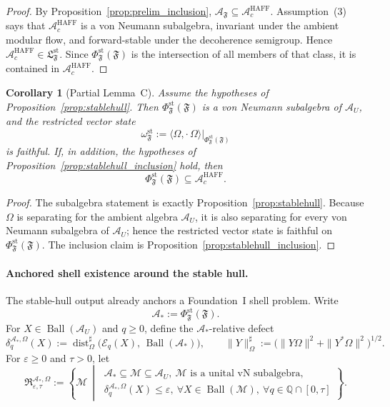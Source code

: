 \documentclass[12pt]{article}
\newtheorem{corollary}[theorem]{Corollary}
\theoremstyle{definition}
\theoremstyle{remark}
\begin{document}
\begin{proof}
By Proposition~\ref{prop:prelim_inclusion},
\(\mathcal A_{\mathfrak F}\subseteq \mathcal A_c^{\mathrm{HAFF}}\).
Assumption~(3) says that \(\mathcal A_c^{\mathrm{HAFF}}\) is a von
Neumann subalgebra, invariant under the ambient modular flow, and
forward-stable under the decoherence semigroup. Hence
\(\mathcal A_c^{\mathrm{HAFF}}\in \mathfrak L_{\mathfrak F}^{\mathrm{st}}\).
Since \(\Phi_{\mathfrak F}^{\mathrm{st}}(\mathfrak F)\) is the
intersection of all members of that class, it is contained in
\(\mathcal A_c^{\mathrm{HAFF}}\).
\end{proof}

\begin{corollary}[Partial Lemma~C]\label{cor:partialC}
Assume the hypotheses of Proposition~\ref{prop:stablehull}. Then
\(\Phi_{\mathfrak F}^{\mathrm{st}}(\mathfrak F)\) is a von Neumann
subalgebra of \(\mathcal A_U\), and the restricted vector state
\[
\omega_{\mathfrak F}^{\mathrm{st}}
:=
\langle\Omega,\cdot\,\Omega\rangle|_{\Phi_{\mathfrak F}^{\mathrm{st}}(\mathfrak F)}
\]
is faithful. If, in addition, the hypotheses of
Proposition~\ref{prop:stablehull_inclusion} hold, then
\[
\Phi_{\mathfrak F}^{\mathrm{st}}(\mathfrak F)\subseteq
\mathcal A_c^{\mathrm{HAFF}}.
\]
\end{corollary}

\begin{proof}
The subalgebra statement is exactly
Proposition~\ref{prop:stablehull}. Because \(\Omega\) is separating for
the ambient algebra \(\mathcal A_U\), it is also separating for every
von Neumann subalgebra of \(\mathcal A_U\); hence the restricted vector
state is faithful on
\(\Phi_{\mathfrak F}^{\mathrm{st}}(\mathfrak F)\). The inclusion claim
is Proposition~\ref{prop:stablehull_inclusion}.
\end{proof}

\paragraph{Anchored shell existence around the stable hull.}
The stable-hull output already anchors a Foundation~I shell problem.
Write
\[
\mathcal A_*:=\Phi_{\mathfrak F}^{\mathrm{st}}(\mathfrak F).
\]
For \(X\in\operatorname{Ball}(\mathcal A_U)\) and \(q\ge 0\), define
the \(\mathcal A_*\)-relative defect
\[
\delta_q^{\mathcal A_*,\Omega}(X)
:=
\operatorname{dist}_{\Omega}^{\sharp}
\bigl(\mathcal E_q(X),\,\operatorname{Ball}(\mathcal A_*)\bigr),
\qquad
\|Y\|_\Omega^\sharp
:=
\bigl(\|Y\Omega\|^2+\|Y^*\Omega\|^2\bigr)^{1/2}.
\]
For \(\varepsilon\ge 0\) and \(\tau>0\), let
\[
\mathfrak R_{\varepsilon,\tau}^{\mathcal A_*,\Omega}
:=
\left\{
\mathcal M\ \middle|\
\begin{array}{l}
\mathcal A_*\subseteq \mathcal M\subseteq \mathcal A_U,\ \mathcal M
\text{ is a unital vN subalgebra},\\[1mm]
\delta_q^{\mathcal A_*,\Omega}(X)\le \varepsilon,\ \forall
X\in\operatorname{Ball}(\mathcal M),\
\forall q\in\mathbb Q\cap[0,\tau]
\end{array}
\right\}.
\]
\end{document}
